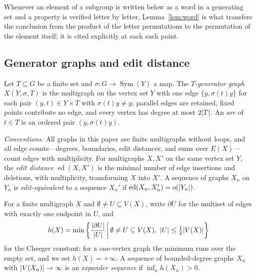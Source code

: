 \documentclass[11pt]{amsart}
\theoremstyle{definition}
\theoremstyle{plain}
\newcommand{\Sym}{\operatorname{Sym}}
\DeclarePairedDelimiter{\abs}{\lvert}{\rvert}
\newcommand{\set}[1]{\left\{#1\right\}}
\newcommand{\suchthat}{\,\middle|\,}
\DeclareMathOperator{\ed}{ed}
\begin{document}
Whenever an element of a subgroup is written below as a word in a generating set and a property is verified letter by letter, Lemma~\ref{lem:word} is what transfers the conclusion from the product of the letter permutations to the permutation of the element itself; it is cited explicitly at each such point.

\subsection{Generator graphs and edit distance}\label{subsec:graphs}

Let \(T\subseteq G\) be a finite set and \(\sigma:G\to\Sym(Y)\) a map.  The \emph{\(T\)-generator graph} \(X(Y,\sigma,T)\) is the multigraph on the vertex set \(Y\) with one edge \(\{y,\sigma(t)y\}\) for each pair \((y,t)\in Y\times T\) with \(\sigma(t)y\ne y\); parallel edges are retained, fixed points contribute no edge, and every vertex has degree at most \(2\abs T\).  An \emph{arc} of \(t\in T\) is an ordered pair \((y,\sigma(t)y)\).

\emph{Conventions.}  All graphs in this paper are finite multigraphs without loops, and all edge counts---degrees, boundaries, edit distances, and sums over \(E(X)\)---count edges with multiplicity.  For multigraphs \(X,X'\) on the same vertex set \(Y\), the \emph{edit distance} \(\ed(X,X')\) is the minimal number of edge insertions and deletions, with multiplicity, transforming \(X\) into \(X'\).  A sequence of graphs \(X_n\) on \(Y_n\) is \emph{edit-equivalent} to a sequence \(X_n'\) if \(\ed(X_n,X_n')=o(\abs{Y_n})\).

For a finite multigraph \(X\) and \(\emptyset\ne U\subseteq V(X)\), write \(\partial U\) for the multiset of edges with exactly one endpoint in \(U\), and
\[
 h(X)=\min\set{\frac{\abs{\partial U}}{\abs U}\suchthat \emptyset\ne U\subseteq V(X),\ \abs U\leq\tfrac12\abs{V(X)}}
\]
for the Cheeger constant; for a one-vertex graph the minimum runs over the empty set, and we set \(h(X)=+\infty\).  A sequence of bounded-degree graphs \(X_n\) with \(\abs{V(X_n)}\to\infty\) is an \emph{expander sequence} if \(\inf_n h(X_n)>0\).
\end{document}
